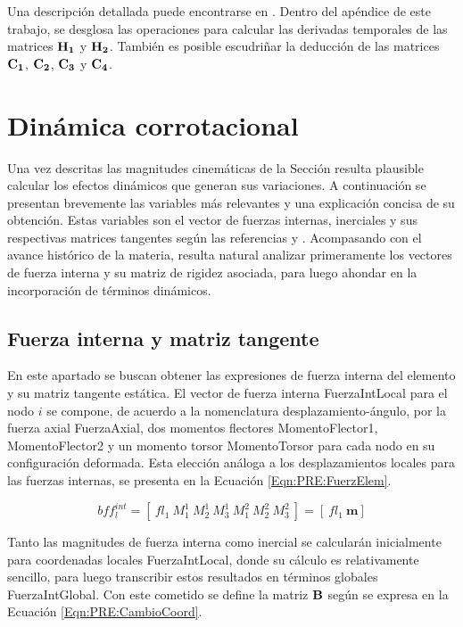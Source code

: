 Una descripción detallada puede encontrarse en \cite{Le2014}. Dentro del apéndice de este trabajo, se desglosa las operaciones para calcular las derivadas temporales de las matrices $\bf{H}_1$ y $\bf{H}_2$. También es posible escudriñar la deducción de las matrices $\bf{C_1}$, $\bf{C_2}$, $\bf{C_3}$ y $\bf{C_4}$.

\section{Dinámica corrotacional}\label{Subsec:PRE:DinamicCorrot}

Una vez descritas las magnitudes cinemáticas de la Sección \label{Subsec:PRE:CinematicCorrot} resulta plausible calcular los efectos dinámicos que generan sus variaciones. A continuación se presentan brevemente las variables más relevantes y una explicación concisa de su obtención. Estas
variables son el vector de fuerzas internas, inerciales y sus respectivas matrices tangentes según las referencias \citep{Le2014} y \citep{Battini2002}. Acompasando con el avance histórico de la materia, resulta natural analizar primeramente los vectores de fuerza interna y su matriz de rigidez asociada, para luego ahondar en la incorporación de términos dinámicos.


\subsection{Fuerza interna y matriz tangente}\label{Sec:PRE:Interna}

En este apartado se buscan obtener las expresiones de fuerza interna del elemento y su matriz tangente estática. El vector de fuerza interna \gls{FuerzaIntLocal} para el nodo $i$ se compone, de acuerdo a la nomenclatura desplazamiento-ángulo, por la fuerza axial \gls{FuerzaAxial}, dos momentos flectores \gls{MomentoFlector1}, \gls{MomentoFlector2} y un momento torsor \gls{MomentoTorsor} para cada nodo en su configuración deformada. Esta elección análoga a los desplazamientos locales para las fuerzas internas, se presenta en la Ecuación \eqref{Eqn:PRE:FuerzElem}.

\begin{equation}\label{Eqn:PRE:FuerzElem}
bf{ f_l^{int}} =[~fl_1 ~M^1_1~ M^1_2~ M^1_3~ M^2_1~ M^2_2~ M^2_3~] = [~fl_1~\boldsymbol{m}]
\end{equation}

Tanto las magnitudes de fuerza interna como inercial se calcularán inicialmente para coordenadas locales \gls{FuerzaIntLocal}, donde su cálculo es relativamente sencillo, para luego transcribir estos resultados en términos globales \gls{FuerzaIntGlobal}. Con este cometido se define la matriz $\bf{B}$ según se expresa en la Ecuación \eqref{Eqn:PRE:CambioCoord}.

